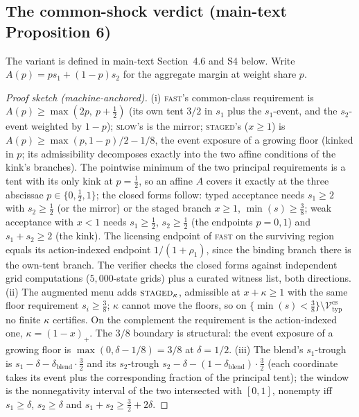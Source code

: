 \documentclass[preprint,11pt,authoryear]{elsarticle}
\theoremstyle{remark}
\newcommand{\Vtyp}{\mathcal{V}_{\mathrm{typ}}}
\newcommand{\act}[1]{\textsc{#1}}
\begin{document}
\subsection{The common-shock verdict (main-text Proposition 6)}\label{si:csproofs}

The variant is defined in main-text Section~4.6 and S4 below. Write $A(p)=ps_1+(1-p)s_2$ for the aggregate margin at weight share $p$.

\begin{proof}[Proof sketch (machine-anchored)]
(i) \act{fast}'s common-class requirement is $A(p)\ge\max(2p,\ p+\tfrac12)$ (its own tent $3/2$ in $s_1$ plus the $s_1$-event, and the $s_2$-event weighted by $1-p$); \act{slow}'s is the mirror; \act{staged}'s ($x\ge1$) is $A(p)\ge\max(p,1-p)/2-1/8$, the event exposure of a growing floor (kinked in $p$; its admissibility decomposes exactly into the two affine conditions of the kink's branches). The pointwise minimum of the two principal requirements is a tent with its only kink at $p=\tfrac12$, so an affine $A$ covers it exactly at the three abscissae $p\in\{0,\tfrac12,1\}$; the closed forms follow: typed acceptance needs $s_1\ge2$ with $s_2\ge\tfrac12$ (or the mirror) or the staged branch $x\ge1$, $\min(s)\ge\tfrac38$; weak acceptance with $x<1$ needs $s_1\ge\tfrac12$, $s_2\ge\tfrac12$ (the endpoints $p=0,1$) and $s_1+s_2\ge2$ (the kink). The licensing endpoint of \act{fast} on the surviving region equals its action-indexed endpoint $1/(1+\rho_1)$, since the binding branch there is the own-tent branch. The verifier checks the closed forms against independent grid computations ($5{,}000$-state grids) plus a curated witness list, both directions.
(ii) The augmented menu adds $\act{staged}_\kappa$, admissible at $x+\kappa\ge1$ with the same floor requirement $s_i\ge\tfrac38$; $\kappa$ cannot move the floors, so on $\{\min(s)<\tfrac38\}\setminus\Vtyp^{\mathrm{cs}}$ no finite $\kappa$ certifies. On the complement the requirement is the action-indexed one, $\kappa=(1-x)_+$. The $3/8$ boundary is structural: the event exposure of a growing floor is $\max(0,\delta-1/8)=3/8$ at $\delta=1/2$.
(iii) The blend's $s_1$-trough is $s_1-\delta-\delta_{\mathrm{blend}}\cdot\tfrac32$ and its $s_2$-trough $s_2-\delta-(1-\delta_{\mathrm{blend}})\cdot\tfrac32$ (each coordinate takes its event plus the corresponding fraction of the principal tent); the window is the nonnegativity interval of the two intersected with $[0,1]$, nonempty iff $s_1\ge\delta$, $s_2\ge\delta$ and $s_1+s_2\ge\tfrac32+2\delta$.
\end{proof}
\end{document}
